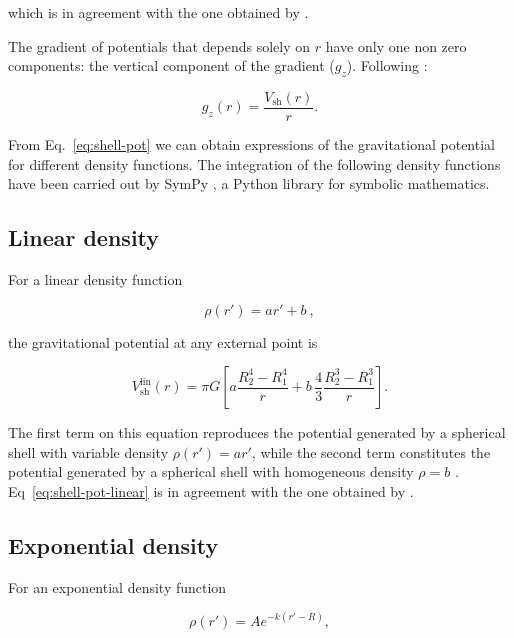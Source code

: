 \documentclass[extra, referee]{gji}
\begin{document}
\noindent which is in agreement with the one obtained by \citet[p.62]{Binney2008}.

The gradient of potentials that depends solely on $r$ have only one non zero components:
the vertical component of the gradient ($g_z$).
Following \citet{Grombein2013}:

\begin{equation}
    g_z(r) = \frac{V_\text{sh}(r)}{r}.
\label{eq:shell-gz}
\end{equation}

From Eq.~\ref{eq:shell-pot} we can obtain expressions of the gravitational potential for
different density functions.
The integration of the following density functions have been carried out by SymPy
\citep{sympy2017}, a Python library for symbolic mathematics.

\subsection{Linear density}

For a linear density function

\begin{equation}
    \rho(r') = ar' + b\ ,
\end{equation}

\noindent
the gravitational potential at any external point is

\begin{equation}
    V_\text{sh}^\text{lin}(r) = \pi G \left[
    a \frac{R_2^4 - R_1^4}{r} +
    b \,\frac{4}{3} \frac{R_2^3 - R_1^3}{r} \right].
    \label{eq:shell-pot-linear}
\end{equation}

\noindent The first term on this equation reproduces the potential generated
by a spherical shell with variable density $\rho(r') = ar'$, while the second
term constitutes the potential generated by a spherical shell with homogeneous
density $\rho = b$ \citep{Mikuska2006,Grombein2013}.
Eq~\ref{eq:shell-pot-linear} is in agreement with the one obtained by \citet{Lin2018}.

\subsection{Exponential density}

For an exponential density function

\begin{equation}
    \rho(r') = A e^{- k (r' - R)},
\end{equation}
\end{document}
